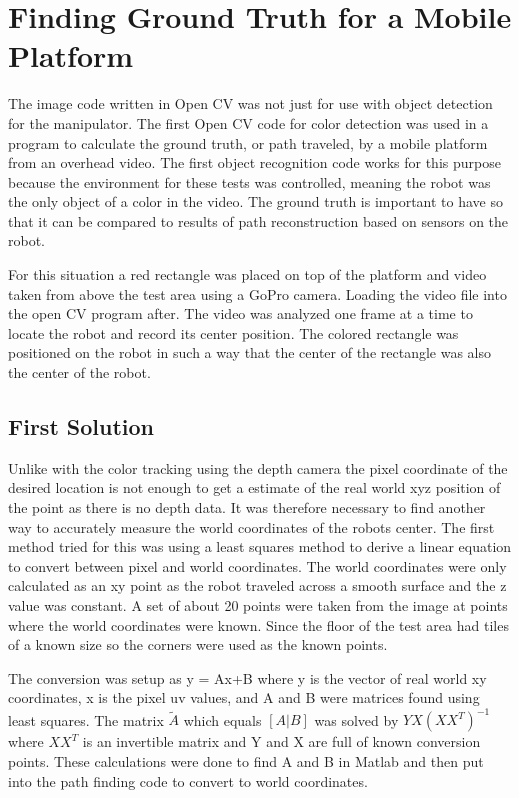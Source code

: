 \chapter{Finding Ground Truth for a Mobile Platform}
The image code written in Open CV was not just for use with object detection for the manipulator. The first Open CV code for color detection was used in a program to calculate the ground truth, or path traveled, by a mobile platform from an overhead video. The first object recognition code works for this purpose because the environment for these tests was controlled, meaning the robot was the only object of a color in the video. The ground truth is important to have so that it can be compared to results of path reconstruction based on sensors on the robot.

For this situation a red rectangle was placed on top of the platform and video taken from above the test area using a GoPro camera. Loading the video file into the open CV program after. The video was analyzed one frame at a time to locate the robot and record its center position. The colored rectangle was positioned on the robot in such a way that the center of the rectangle was also the center of the robot.
 
\section{First Solution}
Unlike with the color tracking using the depth camera the pixel coordinate of the desired location is not enough to get a estimate of the real world xyz position of the point as there is no depth data. It was therefore necessary to find another way to accurately measure the world coordinates of the robots center. The first method tried for this was using a least squares method to derive a linear equation to convert between pixel and world coordinates. The world coordinates were only calculated as an xy point as the robot traveled across a smooth surface and the z value was constant. A set of about 20 points were taken from the image at points where the world coordinates were known. Since the floor of the test area had tiles of a known size so the corners were used as the known points. 

The conversion was setup as y = Ax+B where y is the vector of real world xy coordinates, x is the pixel uv values, and A and B were matrices found using least squares. The matrix $\tilde{A}$ which equals $[A|B]$ was solved by $YX(XX^T)^{-1}$ where $XX^T$ is an invertible matrix and Y and X are full of known conversion points. These calculations were done to find A and B in Matlab and then put into the path finding code to convert to world coordinates.

